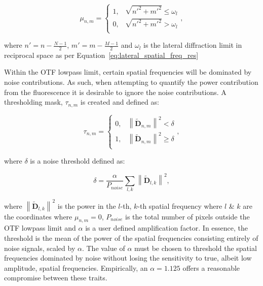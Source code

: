 \begin{equation}\label{eq:circular_mask}
\mu_{n,m} = 
\begin{cases}
1, & \sqrt{n'^{2} + m'^{2}} \le \omega_{l}\\
0, & \sqrt{n'^{2} + m'^{2}} > \omega_{l}\\ 
\end{cases},
\end{equation}

where $n' = n - \frac{N-1}{2}$, $m' = m - \frac{M-1}{2}$ and $\omega_{l}$ 
is the lateral diffraction limit in reciprocal space as per
Equation~\ref{eq:lateral_spatial_freq_res} 

Within the OTF lowpass limit, certain spatial frequencies will be dominated
by noise contributions. As such, when attempting to quantify the power 
contribution from the fluorescence it is desirable to ignore the noise
contributions. A thresholding mask, $\tau_{n,m}$ is created and defined as:

\begin{equation}\label{eq:noise_threshold_mask}
\tau_{n,m} = 
\begin{cases}
0, & \left\| \tilde{\textbf{D}}_{n,m} \right\|^2 < \delta\\
1, & \left\| \tilde{\textbf{D}}_{n,m} \right\|^2 \ge \delta\\ 
\end{cases},
\end{equation}

where $\delta$ is a noise threshold defined as:

\begin{equation}\label{eq:noise_threshold}
\delta = \frac{\alpha}{P_{noise}}\sum\limits_{l,k}{\left\| \tilde{\textbf{D}}_{l,k} \right\|^2},
\end{equation}

where $\left\| \tilde{\textbf{D}}_{l,k} \right\|^2$ is the power in the 
$l$-th, $k$-th spatial frequency where $l$ \& $k$ are the coordinates 
where $\mu_{n,m} = 0$, $P_{noise}$ is the total number of pixels 
outside the OTF lowpass limit and $\alpha$ is a user defined 
amplification factor. In essence, the threshold is the mean of the
power of the spatial frequencies consisting entirely of noise signals,
scaled by $\alpha$.	The value of $\alpha$ must be chosen to threshold
the spatial frequencies dominated by noise without losing the sensitivity
to true, albeit low amplitude, spatial frequencies. Empirically, an 
$\alpha = 1.125$ offers a reasonable compromise between these traits.

